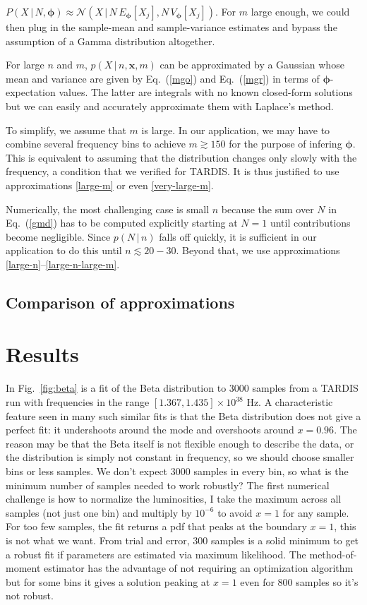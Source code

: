 \documentclass[11pt]{article}
\newcounter{mnumi}
\newenvironment{mnumerate}{
  \begin{list}{\arabic{mnumi}.}
    {\usecounter{mnumi} \setlength{\itemsep}{0pt}
      \setlength{\leftmargin}{3ex}
    }
  }
  {\end{list}}
\newcommand{\cond}{\,|\,}
\newcommand{\bmx}{{{\bm{x}}}}
\newcommand{\bmphi}{{\bm{\phi}}}
\newcommand{\refeq}[1]{Eq.~(\ref{#1})}
\newcommand{\reffig}[1]{Fig.~\ref{fig:#1}}
\begin{document}
\begin{mnumerate}
  $P(X \cond N, \bmphi) \approx \mathcal{N}(X \cond N \,
  E_\bmphi[X_j], N \, V_\bmphi[X_j])$. For $m$ large enough, we could
  then plug in the sample-mean and sample-variance estimates and
  bypass the assumption of a Gamma distribution altogether.
  \item \label{large-n-large-m} For large $n$ and $m$, $ p(X\cond
  n,\bmx,m)$ can be approximated by a Gaussian whose mean and variance
  are given by \refeq{mgo} and \refeq{mgr} in terms of
  $\bmphi$-expectation values. The latter are integrals with no known
  closed-form solutions but we can easily and accurately approximate
  them with Laplace's method.
\end{mnumerate}
To simplify, we assume that $m$ is large. In our application, we may
have to combine several frequency bins to achieve $m \gtrsim 150$ for
the purpose of infering $\bmphi$. This is equivalent to assuming that
the distribution changes only slowly with the frequency, a condition
that we verified for TARDIS. It is thus justified to use
approximations \ref{large-m} or even \ref{very-large-m}.

Numerically, the most challenging case is small $n$ because the sum
over $N$ in \refeq{gmd} has to be computed explicitly starting at
$N=1$ until contributions become negligible. Since $p(N \cond n)$
falls off quickly, it is sufficient in our application to do this
until $n \lesssim 20-30$. Beyond that, we use approximations
\ref{large-n}--\ref{large-n-large-m}.

\subsection*{Comparison of approximations}

\section{Results}

In \reffig{beta} is a fit of the Beta distribution to 3000
samples from a TARDIS run with frequencies in the range $[1.367,
1.435] \times 10^{38}$ Hz. A characteristic feature seen in many such
similar fits is that the Beta distribution does not give a perfect
fit: it undershoots around the mode and overshoots around
$x=0.96$. The reason may be that the Beta itself is not flexible
enough to describe the data, or the distribution is simply not
constant in frequency, so we should choose smaller bins or less
samples. We don't expect 3000 samples in every bin, so what is the
minimum number of samples needed to work robustly? The first numerical
challenge is how to normalize the luminosities, I take the maximum
across all samples (not just one bin) and multiply by $10^{-6}$ to
avoid $x=1$ for any sample. For too few samples, the fit returns a pdf
that peaks at the boundary $x=1$, this is not what we want. From trial
and error, 300 samples is a solid minimum to get a robust fit if
parameters are estimated via maximum likelihood. The method-of-moment
estimator has the advantage of not requiring an optimization algorithm
but for some bins it gives a solution peaking at $x=1$ even for 800
samples so it's not robust.
\end{document}
